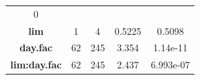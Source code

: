\documentclass[]{article}
\begin{document}
\begin{longtable}[]{@{}ccccc@{}}
\begin{minipage}[t]{0.12\columnwidth}
0
\strut\end{minipage}\tabularnewline
\begin{minipage}[t]{0.21\columnwidth}\centering\strut
\textbf{lim}
\strut\end{minipage} &
\begin{minipage}[t]{0.10\columnwidth}\centering\strut
1
\strut\end{minipage} &
\begin{minipage}[t]{0.10\columnwidth}\centering\strut
4
\strut\end{minipage} &
\begin{minipage}[t]{0.12\columnwidth}\centering\strut
0.5225
\strut\end{minipage} &
\begin{minipage}[t]{0.12\columnwidth}\centering\strut
0.5098
\strut\end{minipage}\tabularnewline
\begin{minipage}[t]{0.21\columnwidth}\centering\strut
\textbf{day.fac}
\strut\end{minipage} &
\begin{minipage}[t]{0.10\columnwidth}\centering\strut
62
\strut\end{minipage} &
\begin{minipage}[t]{0.10\columnwidth}\centering\strut
245
\strut\end{minipage} &
\begin{minipage}[t]{0.12\columnwidth}\centering\strut
3.354
\strut\end{minipage} &
\begin{minipage}[t]{0.12\columnwidth}\centering\strut
1.14e-11
\strut\end{minipage}\tabularnewline
\begin{minipage}[t]{0.21\columnwidth}\centering\strut
\textbf{lim:day.fac}
\strut\end{minipage} &
\begin{minipage}[t]{0.10\columnwidth}\centering\strut
62
\strut\end{minipage} &
\begin{minipage}[t]{0.10\columnwidth}\centering\strut
245
\strut\end{minipage} &
\begin{minipage}[t]{0.12\columnwidth}\centering\strut
2.437
\strut\end{minipage} &
\begin{minipage}[t]{0.12\columnwidth}\centering\strut
6.993e-07
\strut\end{minipage}\tabularnewline
\bottomrule
\end{longtable}
\end{document}
